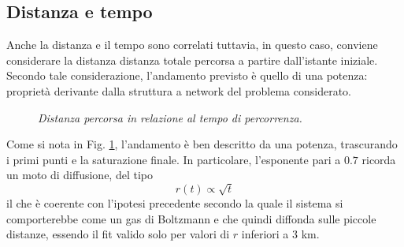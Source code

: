 \documentclass[12pt,a4paper]{article}
\begin{document}
\subsection{Distanza e tempo}
Anche la distanza e il tempo sono correlati tuttavia, in questo caso, conviene considerare la distanza distanza totale percorsa a partire dall'istante iniziale.
Secondo tale considerazione, l'andamento previsto è quello di una potenza: proprietà derivante dalla struttura a network del problema considerato.
\begin{figure}[H]
\centering
{}
\caption{\emph{Distanza percorsa in relazione al tempo di percorrenza.}}
\label{figure:dist_temp}
\end{figure}
Come si nota in Fig. \ref{figure:dist_temp}, l'andamento è ben descritto da una potenza, trascurando i primi punti e la saturazione finale.
In particolare, l'esponente pari a $0.7$ ricorda un moto di diffusione, del tipo
\begin{equation}
r(t)\propto\sqrt{t}
\label{equation:rt}
\end{equation}
il che è coerente con l'ipotesi precedente secondo la quale il sistema si comporterebbe come un gas di Boltzmann e che quindi diffonda sulle piccole distanze, essendo il fit valido solo per valori di $r$ inferiori a $3$ km.
\end{document}
